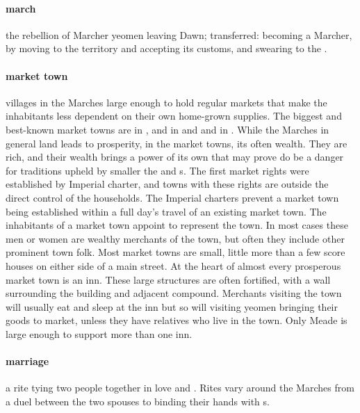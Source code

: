 \paragraph{march} the rebellion of Marcher yeomen leaving Dawn; transferred: becoming a Marcher, by moving to the territory and accepting its customs, and swearing to the .
\paragraph{market town} villages in the Marches large enough to hold regular markets that make the inhabitants less dependent on their own home-grown supplies. The biggest and best-known market towns are  in ,  and  in  and  and  in . While the Marches in general land leads to prosperity, in the market towns, its often wealth. They are rich, and their wealth brings a power of its own that may prove do be a danger for traditions upheld by smaller the  and s. \localpar The first market rights were established by Imperial charter, and towns with these rights are outside the direct control of the households. The Imperial charters prevent a market town being established within a full day's travel of an existing market town. The inhabitants of a market town appoint  to represent the town. In most cases these men or women are wealthy merchants of the town, but often they include other prominent town folk. \localpar Most market towns are small, little more than a few score houses on either side of a main street. At the heart of almost every prosperous market town is an inn. These large structures are often fortified, with a wall surrounding the building and adjacent compound. Merchants visiting the town will usually eat and sleep at the inn but so will visiting yeomen bringing their goods to market, unless they have relatives who live in the town. Only Meade is large enough to support more than one inn. 
\paragraph{marriage} a rite tying two people together in love and . Rites vary around the Marches from a duel between the two spouses to binding their hands with s.
